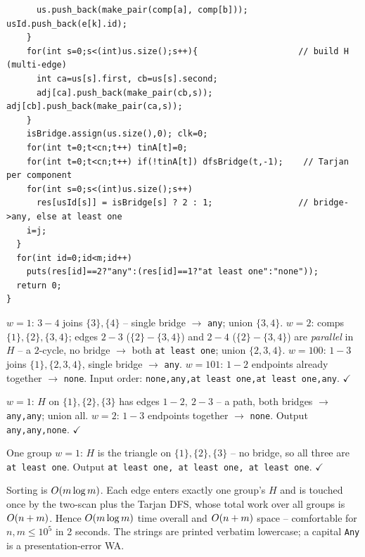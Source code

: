 \begin{lstlisting}
      us.push_back(make_pair(comp[a], comp[b])); usId.push_back(e[k].id);
    }
    for(int s=0;s<(int)us.size();s++){                    // build H (multi-edge)
      int ca=us[s].first, cb=us[s].second;
      adj[ca].push_back(make_pair(cb,s)); adj[cb].push_back(make_pair(ca,s));
    }
    isBridge.assign(us.size(),0); clk=0;
    for(int t=0;t<cn;t++) tinA[t]=0;
    for(int t=0;t<cn;t++) if(!tinA[t]) dfsBridge(t,-1);    // Tarjan per component
    for(int s=0;s<(int)us.size();s++)
      res[usId[s]] = isBridge[s] ? 2 : 1;                 // bridge->any, else at least one
    i=j;
  }
  for(int id=0;id<m;id++)
    puts(res[id]==2?"any":(res[id]==1?"at least one":"none"));
  return 0;
}
\end{lstlisting}

\begin{tracebox}
\(w{=}1\): \(3\!-\!4\) joins \(\{3\},\{4\}\) -- single bridge \(\to\) \texttt{any}; union
\(\{3,4\}\).  \(w{=}2\): comps \(\{1\},\{2\},\{3,4\}\); edges \(2\!-\!3\) (\(\{2\}\!-\!\{3,4\}\))
and \(2\!-\!4\) (\(\{2\}\!-\!\{3,4\}\)) are \emph{parallel} in \(H\) -- a \(2\)-cycle, no
bridge \(\to\) both \texttt{at least one}; union \(\{2,3,4\}\).  \(w{=}100\): \(1\!-\!3\)
joins \(\{1\},\{2,3,4\}\), single bridge \(\to\) \texttt{any}.  \(w{=}101\): \(1\!-\!2\)
endpoints already together \(\to\) \texttt{none}.  Input order:
\texttt{none,any,at least one,at least one,any}. \(\checkmark\)
\end{tracebox}
\begin{tracebox}[Sample 2: \, \(1\!-\!2{:}1,\ 2\!-\!3{:}1,\ 1\!-\!3{:}2\)]
\(w{=}1\): \(H\) on \(\{1\},\{2\},\{3\}\) has edges \(1\!-\!2,\ 2\!-\!3\) -- a path, both
bridges \(\to\) \texttt{any,any}; union all.  \(w{=}2\): \(1\!-\!3\) endpoints together
\(\to\) \texttt{none}.  Output \texttt{any,any,none}. \(\checkmark\)
\end{tracebox}
\begin{tracebox}
One group \(w{=}1\): \(H\) is the triangle on \(\{1\},\{2\},\{3\}\) -- no bridge, so all
three are \texttt{at least one}.  Output \texttt{at least one, at least one, at least
one}. \(\checkmark\)
\end{tracebox}

\begin{complexitybox}
Sorting is \(O(m\log m)\).  Each edge enters exactly one group's \(H\) and is
touched once by the two-scan plus the Tarjan DFS, whose total work over all groups
is \(O(n+m)\).  Hence \(O(m\log m)\) time overall and \(O(n+m)\) space --
comfortable for \(n,m\le 10^5\) in 2 seconds.  The strings are printed verbatim
lowercase; a capital \texttt{Any} is a presentation-error WA.
\end{complexitybox}

